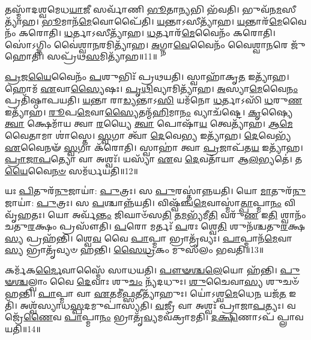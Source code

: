 𑌤𑌸𑍍𑌮𑌾᳴𑌦𑌶𑍍𑌵𑌮𑍇𑌧\-\ul{𑌯𑌾}\-𑌜𑍀 𑌸𑌰𑍍𑌵𑌾᳴𑌣𑌿 \ul{𑌭𑍂}\-𑌤𑌾\-\ul{𑌨𑍍𑌯}\-𑌭𑌿 𑌭᳴𑌵𑌤𑌿।
𑌭𑍁𑌵᳴𑌨\-\ul{𑌮}\-𑌸𑍀\-𑌤𑍍𑌯𑌾᳴𑌹।
\-\ul{𑌭𑍂}\-𑌮𑌾𑌨᳴\-\ul{𑌮𑍇}\-𑌵𑍋𑌪𑍈᳴𑌤𑌿।
\-\ul{𑌯}\-𑌨𑍍𑌤𑌾\-𑌽𑌸𑍀𑌤𑍍𑌯𑌾᳴𑌹।
\-\ul{𑌯}\-𑌨𑍍𑌤𑌾𑌰᳴\-\ul{𑌮𑍇}\-𑌵𑍈𑌨𑌂᳴ 𑌕𑌰𑍋𑌤𑌿।
\-\ul{𑌧}\-𑌰𑍍𑌤𑌾𑌽𑌸𑍀𑌤𑍍𑌯𑌾᳴𑌹।
\-\ul{𑌧}\-𑌰𑍍𑌤𑌾𑌰᳴\-\ul{𑌮𑍇}\-𑌵𑍈𑌨𑌂᳴ 𑌕𑌰𑍋𑌤𑌿।
𑌸𑍋॑𑌽𑌗𑍍𑌨𑌿𑌂 𑌵𑍈॑𑌶𑍍𑌵𑌾\-\ul{𑌨}\-𑌰𑌮𑌿𑌤𑍍𑌯𑌾᳴𑌹।
\-\ul{𑌅}\-𑌗𑍍𑌨𑌾\-\ul{𑌵𑍇}\-𑌵𑍈𑌨𑌂᳴ 𑌵𑍈𑌶𑍍𑌵𑌾\-\ul{𑌨}\-𑌰𑍇 𑌜𑍁᳴𑌹𑍋𑌤𑌿।
𑌸𑌪𑍍𑌰᳴𑌥\-\ul{𑌸}\-𑌮𑌿𑌤𑍍𑌯𑌾᳴𑌹॥11॥

\-\ul{𑌪𑍍𑌰}\-𑌜\-\ul{𑌯𑍈}\-𑌵𑍈𑌨𑌂᳴ \ul{𑌪}\-𑌶𑍁𑌭𑌿𑌃᳴ 𑌪𑍍𑌰𑌥𑌯𑌤𑌿।
𑌸𑍍𑌵𑌾𑌹𑌾᳴𑌕𑍃\-\ul{𑌤} 𑌇𑌤𑍍𑌯𑌾᳴𑌹।
𑌹𑍋𑌮᳴ \ul{𑌏}\-𑌵𑌾\-\ul{𑌸𑍍𑌯𑍈}\-𑌷𑌃।
\-\ul{𑌪𑍃}\-\-\ul{𑌥𑌿}\-𑌵𑍍𑌯𑌾𑌮𑌿𑌤𑍍𑌯𑌾᳴𑌹।
\-\ul{𑌅}\-𑌸𑍍𑌯𑌾\-\ul{𑌮𑍇}\-𑌵𑍈\-\ul{𑌨𑌂} 𑌪𑍍𑌰𑌤𑌿᳴\-𑌷𑍍𑌠𑌾𑌪𑌯𑌤𑌿।
\-\ul{𑌯}\-𑌨𑍍𑌤𑌾 𑌰𑌾\-\ul{𑌡𑍍𑌯}\-𑌨𑍍𑌤𑌾𑌽\-\ul{𑌸𑌿} 𑌯𑌮᳴𑌨𑍋 \ul{𑌧}\-𑌰𑍍𑌤𑌾𑌽𑌸𑌿᳴ \ul{𑌧}\-𑌰𑍁\-\ul{𑌣} 𑌇𑌤𑍍𑌯𑌾᳴𑌹।
\-\ul{𑌰𑍂}\-𑌪\-\ul{𑌮𑍇}\-𑌵𑌾\-\ul{𑌸𑍍𑌯𑍈}\-𑌤𑌨𑍍𑌮᳴\-\ul{𑌹𑌿}\-𑌮𑌾\-\ul{𑌨𑌂} 𑌵𑍍𑌯𑌾𑌚᳴𑌷𑍍𑌟𑍇।
\-\ul{𑌕𑍃}\-𑌷𑍍𑌯𑍈 \ul{𑌤𑍍𑌵𑌾} 𑌕𑍍𑌷𑍇𑌮𑌾᳴𑌯 𑌤𑍍𑌵𑌾 \ul{𑌰}\-𑌯𑍍𑌯𑍈 \ul{𑌤𑍍𑌵𑌾} 𑌪𑍋𑌷𑌾᳴\-\ul{𑌯} 𑌤𑍍𑌵𑍇𑌤𑍍𑌯𑌾᳴𑌹।
\-\ul{𑌆}\-\-\-\ul{𑌮𑍇}\-𑌵𑍈𑌤𑌾𑌮𑌾 𑌶𑌾॑𑌸𑍍𑌤𑍇।
\-\ul{𑌸𑍍𑌵}\-𑌗𑌾 𑌤𑍍𑌵𑌾᳴ \ul{𑌦𑍇}\-𑌵𑍇\-\ul{𑌭𑍍𑌯} 𑌇𑌤𑍍𑌯𑌾᳴𑌹।
\-\ul{𑌦𑍇}\-𑌵𑍇𑌭𑍍𑌯᳴ \ul{𑌏}\-𑌵𑍈𑌨𑍟᳴ \ul{𑌸𑍍𑌵}\-𑌗𑌾 𑌕᳴𑌰𑍋𑌤𑌿।
𑌸𑍍𑌵𑌾𑌹𑌾॑ 𑌤𑍍𑌵𑌾 \ul{𑌪𑍍𑌰}\-𑌜𑌾𑌪᳴𑌤\-\ul{𑌯} 𑌇𑌤𑍍𑌯𑌾᳴𑌹।
\-\ul{𑌪𑍍𑌰𑌾}\-\-\ul{𑌜𑌾}\-\-\ul{𑌪}\-𑌤𑍍𑌯𑍋 𑌵𑌾 𑌅𑌶𑍍𑌵𑌃᳴।
𑌯𑌸𑍍𑌯𑌾᳴ \ul{𑌏}\-𑌵 \ul{𑌦𑍇}\-𑌵𑌤𑌾᳴𑌯𑌾 𑌆\-\ul{𑌲}\-𑌭𑍍𑌯𑌤𑍇॑।
𑌤\-\ul{𑌯𑍈}\-𑌵𑍈\-\ul{𑌨}\-\-\ul{𑍞} 𑌸𑌮᳴𑌰𑍍𑌧𑌯𑌤𑌿॥12॥\anuvakamend[\-\ul{𑌬}\-\-\ul{𑌧𑍍𑌨𑌾}\-\-\ul{𑌤𑌿} 𑌸𑌮𑍃᳴𑌦𑍍𑌧𑍍𑌯𑌾 \ul{𑌉}\-𑌪𑌾𑌦᳴𑌧𑌾\-\ul{𑌤𑍍𑌯}\-𑌸𑍀𑌤𑍍𑌯𑌾᳴\-\ul{𑌹} 𑌸𑌪𑍍𑌰᳴𑌥\-\ul{𑌸}\-𑌮𑌿𑌤𑍍𑌯𑌾᳴𑌹 \ul{𑌦𑍇}\-𑌵𑍇\-\ul{𑌭𑍍𑌯} 𑌇𑌤𑍍𑌯𑌾᳴\-\ul{𑌹} 𑌪𑌞𑍍𑌚᳴ 𑌚]

𑌯𑌃 \ul{𑌪𑌿}\-𑌤𑍁𑌰᳴\-\ul{𑌨𑍁}\-𑌜𑌾𑌯𑌾॑: \ul{𑌪𑍁}\-𑌤𑍍𑌰𑌃।
𑌸 \ul{𑌪𑍁}\-𑌰𑌸𑍍𑌤𑌾॑𑌨𑍍𑌨𑌯𑌤𑌿।
𑌯𑍋 \ul{𑌮𑌾}\-𑌤𑍁𑌰᳴\-\ul{𑌨𑍁}\-𑌜𑌾𑌯𑌾॑: \ul{𑌪𑍁}\-𑌤𑍍𑌰𑌃।
𑌸 \ul{𑌪}\-𑌶𑍍𑌚𑌾𑌨𑍍𑌨᳴𑌯𑌤𑌿।
𑌵𑌿𑌷𑍍𑌵᳴𑌞𑍍𑌚\-\ul{𑌮𑍇}\-𑌵𑌾𑌸𑍍𑌮𑌾॑\-\ul{𑌤𑍍𑌪𑌾}\-𑌪𑍍𑌮𑌾\-\ul{𑌨𑌂} 𑌵𑌿𑌵𑍃᳴𑌹𑌤𑌃।
𑌯𑍋 𑌅𑌰𑍍𑌵᳴\-\ul{𑌨𑍍𑌤𑌂} 𑌜𑌿𑌘𑌾𑍞᳴𑌸\-\ul{𑌤𑌿} 𑌤\-\ul{𑌮}\-𑌭𑍍𑌯᳴𑌮𑍀\-\ul{𑌤𑌿} 𑌵𑌰𑍁᳴\-\ul{𑌣} 𑌇\-\ul{𑌤𑌿} 𑌶𑍍𑌵𑌾𑌨𑌂᳴ 𑌚𑌤𑍁\-\ul{𑌰}\-𑌕𑍍𑌷𑌂 𑌪𑍍𑌰𑌸𑍗᳴𑌤𑌿।
\-\ul{𑌪}\-𑌰𑍋 𑌮𑌰𑍍𑌤𑌃᳴ \ul{𑌪}\-𑌰𑌃 𑌶𑍍𑌵𑍇\-\ul{𑌤𑌿} 𑌶𑍁𑌨᳴𑌶𑍍𑌚𑌤𑍁\-\ul{𑌰}\-𑌕𑍍𑌷\-\ul{𑌸𑍍𑌯} 𑌪𑍍𑌰𑌹᳴𑌨𑍍𑌤𑌿।
𑌶𑍍𑌵𑍇\-\ul{𑌵} 𑌵𑍈 \ul{𑌪𑌾}\-𑌪𑍍𑌮𑌾 𑌭𑍍𑌰𑌾𑌤𑍃᳴𑌵𑍍𑌯𑌃।
\-\ul{𑌪𑌾}\-𑌪𑍍𑌮𑌾𑌨᳴\-\ul{𑌮𑍇}\-𑌵𑌾\-\ul{𑌸𑍍𑌯} 𑌭𑍍𑌰𑌾𑌤𑍃᳴𑌵𑍍𑌯𑍞 𑌹𑌨𑍍𑌤𑌿।
\-\ul{𑌸𑍈}\-\-\ul{𑌧𑍍𑌰}\-𑌕𑌂 𑌮𑍁𑌸᳴𑌲𑌂 𑌭𑌵𑌤𑌿॥13॥

𑌕𑌰𑍍𑌮᳴𑌕\-\ul{𑌰𑍍𑌮𑍈}\-𑌵𑌾𑌸𑍍𑌮𑍈᳴ 𑌸𑌾𑌧𑌯𑌤𑌿।
\-\ul{𑌪𑍗}\-\-\ul{𑍟}\-\-\ul{𑌶𑍍𑌚}\-\-\ul{𑌲𑍇}\-𑌯𑍋 𑌹᳴𑌨𑍍𑌤𑌿।
\-\ul{𑌪𑍁}\-\-\ul{𑍟}\-\-\ul{𑌶𑍍𑌚}\-𑌲𑍍𑌵𑌾𑌂 𑌵𑍈 \ul{𑌦𑍇}\-𑌵𑌾𑌃 𑌶𑍁\-\ul{𑌚𑌂} 𑌨𑍍𑌯᳴𑌦𑌧𑍁𑌃।
\-\ul{𑌶𑍁}\-𑌚𑍈𑌵𑌾\-\ul{𑌸𑍍𑌯} 𑌶𑍁𑌚𑍞᳴ 𑌹𑌨𑍍𑌤𑌿।
\-\ul{𑌪𑌾}\-𑌪𑍍𑌮𑌾 𑌵𑌾 \ul{𑌏}\-𑌤𑌮𑍀॑\-\ul{𑌫𑍍𑌸}\-𑌤𑍀𑌤𑍍𑌯𑌾᳴𑌹𑍁𑌃।
𑌯𑍋॑𑌽𑌶𑍍𑌵\-\ul{𑌮𑍇}\-𑌧𑍇\-\ul{𑌨} 𑌯𑌜᳴\-\ul{𑌤} 𑌇𑌤𑌿᳴।
𑌅𑌶𑍍𑌵᳴𑌸𑍍𑌯𑌾𑌧\-\ul{𑌸𑍍𑌪}\-𑌦𑌮𑍁\-𑌪𑌾॑𑌸𑍍𑌯𑌤𑌿।
\-\ul{𑌵}\-𑌜𑍍𑌰𑍀 𑌵𑌾 𑌅𑌶𑍍𑌵𑌃᳴ 𑌪𑍍𑌰𑌾𑌜𑌾\-\ul{𑌪}\-𑌤𑍍𑌯𑌃।
𑌵𑌜𑍍𑌰𑍇᳴\-\ul{𑌣𑍈}\-𑌵 \ul{𑌪𑌾}\-𑌪𑍍𑌮𑌾\-\ul{𑌨𑌂} 𑌭𑍍𑌰𑌾𑌤𑍃᳴\-\ul{𑌵𑍍𑌯}\-𑌮𑌵᳴\-𑌕𑍍𑌰𑌾𑌮𑌤𑌿।
\-\ul{𑌦}\-\-\ul{𑌕𑍍𑌷𑌿}\-𑌣𑌾𑌽𑌪᳴ 𑌪𑍍𑌲𑌾𑌵𑌯𑌤𑌿॥14॥

